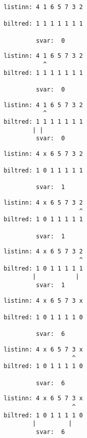 { \begin{verbatim}
       listinn: 4 1 6 5 7 3 2

       biltred: 1 1 1 1 1 1 1

                svar:  0
\end{verbatim}}
{ \begin{verbatim}
       listinn: 4 1 6 5 7 3 2
                  ^
       biltred: 1 1 1 1 1 1 1

                svar:  0
\end{verbatim}}
{ \begin{verbatim}
       listinn: 4 1 6 5 7 3 2
                  ^
       biltred: 1 1 1 1 1 1 1
               | |
                svar:  0
\end{verbatim}}
{ \begin{verbatim}
       listinn: 4 x 6 5 7 3 2

       biltred: 1 0 1 1 1 1 1

                svar:  1
\end{verbatim}}
{ \begin{verbatim}
       listinn: 4 x 6 5 7 3 2
                            ^
       biltred: 1 0 1 1 1 1 1

                svar:  1
\end{verbatim}}
{ \begin{verbatim}
       listinn: 4 x 6 5 7 3 2
                            ^
       biltred: 1 0 1 1 1 1 1
               |           |
                svar:  1
\end{verbatim}}
{ \begin{verbatim}
       listinn: 4 x 6 5 7 3 x

       biltred: 1 0 1 1 1 1 0

                svar:  6
\end{verbatim}}
{ \begin{verbatim}
       listinn: 4 x 6 5 7 3 x
                          ^
       biltred: 1 0 1 1 1 1 0

                svar:  6
\end{verbatim}}
{ \begin{verbatim}
       listinn: 4 x 6 5 7 3 x
                          ^
       biltred: 1 0 1 1 1 1 0
               |         |
                svar:  6
\end{verbatim}}
